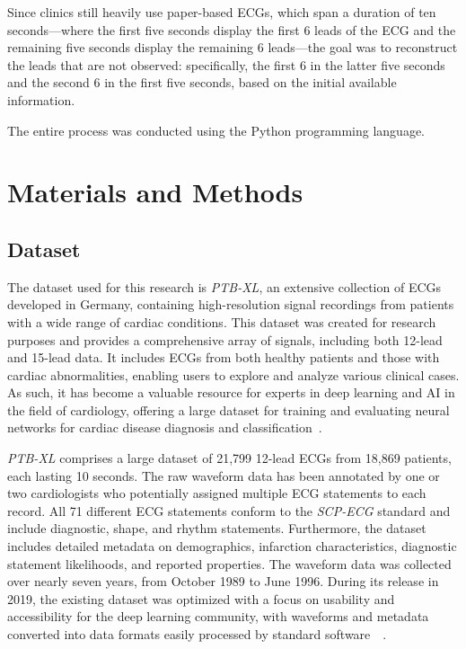 \documentclass[12pt,english]{report}
\begin{document}
Since clinics still heavily use paper-based ECGs, which span a duration of ten seconds—where the first five seconds display the first 6 leads of the ECG and the remaining five seconds display the remaining 6 leads—the goal was to reconstruct the leads that are not observed: specifically, the first 6 in the latter five seconds and the second 6 in the first five seconds, based on the initial available information.

The entire process was conducted using the Python programming language.

\chapter{Materials and Methods}
\label{chap:materials}

\section{Dataset}
\label{sec:dataset}

The dataset used for this research is \textit{PTB-XL}, an extensive collection of ECGs developed in Germany, containing high-resolution signal recordings from patients with a wide range of cardiac conditions. This dataset was created for research purposes and provides a comprehensive array of signals, including both 12-lead and 15-lead data. It includes ECGs from both healthy patients and those with cardiac abnormalities, enabling users to explore and analyze various clinical cases. As such, it has become a valuable resource for experts in deep learning and AI in the field of cardiology, offering a large dataset for training and evaluating neural networks for cardiac disease diagnosis and classification~\cite{datasetdistro}.

\textit{PTB-XL} comprises a large dataset of 21,799 12-lead ECGs from 18,869 patients, each lasting 10 seconds. The raw waveform data has been annotated by one or two cardiologists who potentially assigned multiple ECG statements to each record. All 71 different ECG statements conform to the \textit{SCP-ECG} standard and include diagnostic, shape, and rhythm statements. Furthermore, the dataset includes detailed metadata on demographics, infarction characteristics, diagnostic statement likelihoods, and reported properties. The waveform data was collected over nearly seven years, from October 1989 to June 1996. During its release in 2019, the existing dataset was optimized with a focus on usability and accessibility for the deep learning community, with waveforms and metadata converted into data formats easily processed by standard software~\cite{dataset}~\cite{datasetref}.
\end{document}
